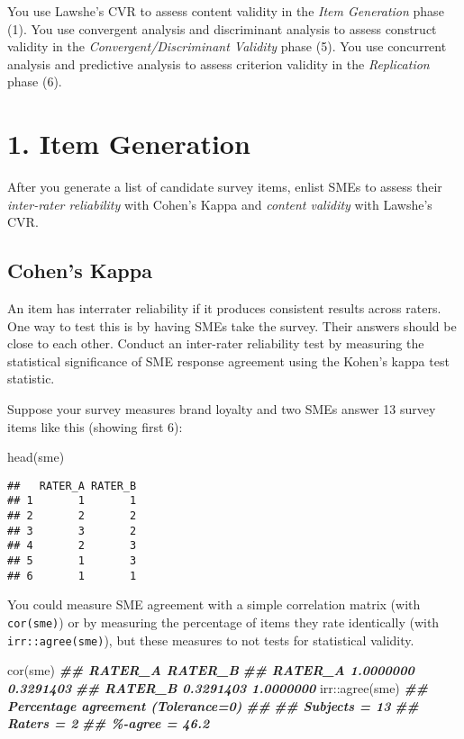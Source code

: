 \documentclass[
]{book}
\newenvironment{Shaded}{\begin{snugshade}}{\end{snugshade}}
\newcommand{\DocumentationTok}[1]{\textcolor[rgb]{0.56,0.35,0.01}{\textbf{\textit{#1}}}}
\newcommand{\FunctionTok}[1]{\textcolor[rgb]{0.00,0.00,0.00}{#1}}
\newcommand{\NormalTok}[1]{#1}
\newcommand{\SpecialCharTok}[1]{\textcolor[rgb]{0.00,0.00,0.00}{#1}}
\theoremstyle{definition}
\theoremstyle{definition}
\theoremstyle{definition}
\theoremstyle{definition}
\theoremstyle{remark}
\begin{document}
You use Lawshe's CVR to assess content validity in the \emph{Item Generation} phase (1). You use convergent analysis and discriminant analysis to assess construct validity in the \emph{Convergent/Discriminant Validity} phase (5). You use concurrent analysis and predictive analysis to assess criterion validity in the \emph{Replication} phase (6).

\hypertarget{item-generation}{%
\section{1. Item Generation}\label{item-generation}}

After you generate a list of candidate survey items, enlist SMEs to assess their \emph{inter-rater reliability} with Cohen's Kappa and \emph{content validity} with Lawshe's CVR.

\hypertarget{cohens-kappa}{%
\subsection{Cohen's Kappa}\label{cohens-kappa}}

An item has interrater reliability if it produces consistent results across raters. One way to test this is by having SMEs take the survey. Their answers should be close to each other. Conduct an inter-rater reliability test by measuring the statistical significance of SME response agreement using the Kohen's kappa test statistic.

Suppose your survey measures brand loyalty and two SMEs answer 13 survey items like this (showing first 6):

\begin{Shaded}
\begin{Highlighting}[]
\FunctionTok{head}\NormalTok{(sme)}
\end{Highlighting}
\end{Shaded}

\begin{verbatim}
##   RATER_A RATER_B
## 1       1       1
## 2       2       2
## 3       3       2
## 4       2       3
## 5       1       3
## 6       1       1
\end{verbatim}

You could measure SME agreement with a simple correlation matrix (with \texttt{cor(sme)}) or by measuring the percentage of items they rate identically (with \texttt{irr::agree(sme)}), but these measures to not tests for statistical validity.

\begin{Shaded}
\begin{Highlighting}[]
\FunctionTok{cor}\NormalTok{(sme)}
\DocumentationTok{\#\#           RATER\_A   RATER\_B}
\DocumentationTok{\#\# RATER\_A 1.0000000 0.3291403}
\DocumentationTok{\#\# RATER\_B 0.3291403 1.0000000}
\NormalTok{irr}\SpecialCharTok{::}\FunctionTok{agree}\NormalTok{(sme)}
\DocumentationTok{\#\#  Percentage agreement (Tolerance=0)}
\DocumentationTok{\#\# }
\DocumentationTok{\#\#  Subjects = 13 }
\DocumentationTok{\#\#    Raters = 2 }
\DocumentationTok{\#\#   \%{-}agree = 46.2}
\end{Highlighting}
\end{Shaded}
\end{document}
